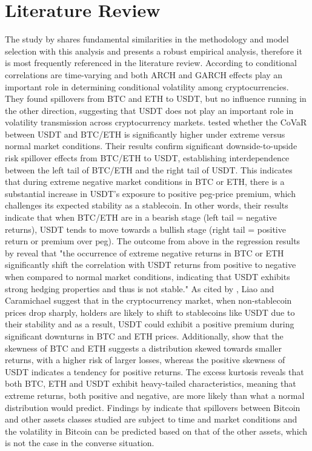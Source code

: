 \documentclass[12pt,a4paper,titlepage,oneside,english]{article}
\begin{document}

\section{Literature Review}

The study by \parencite{Chen03032026} shares fundamental similarities in the methodology and model selection with this analysis and presents a robust empirical analysis, therefore it is most frequently referenced in the literature review.
According to \parencite{jrfm14100493} conditional correlations are time-varying and both ARCH and GARCH effects play an important role in determining conditional volatility among cryptocurrencies. They found spillovers from BTC and ETH to USDT, but no influence running in the other direction, suggesting that USDT does not play an important role in volatility transmission across cryptocurrency markets.
\parencite{Chen03032026} tested whether the CoVaR between USDT and BTC/ETH is significantly higher under extreme versus normal market conditions. Their results confirm significant downside-to-upside risk spillover effects from BTC/ETH to USDT, establishing interdependence between the left tail of BTC/ETH and the right tail of USDT. This indicates that during extreme negative market conditions in BTC or ETH, there is a substantial increase in USDT’s exposure to positive peg-price premium, which challenges its expected stability as a stablecoin. In other words, their results indicate that when BTC/ETH are in a bearish stage (left tail = negative returns), USDT tends to move towards a bullish stage (right tail = positive return or premium over peg).
The outcome from above in the regression results by \parencite{Chen03032026} reveal that "the occurrence of extreme negative returns in BTC or ETH significantly shift the correlation with USDT returns from positive to negative when compared to normal market conditions, indicating that USDT exhibits strong hedging properties and thus is not stable."
As cited by \parencite{Chen03032026}, Liao and Caramichael \parencite{liao2022stablecoins} suggest that in the cryptocurrency market, when non-stablecoin prices drop sharply, holders are likely to shift to stablecoins like USDT due to their stability and as a result, USDT could exhibit a positive premium during significant downturns in BTC and ETH prices. 
Additionally, \parencite{Chen03032026} show that the  skewness of BTC and ETH suggests a distribution skewed towards smaller returns, with a higher risk of larger losses, whereas the positive skewness of USDT indicates a tendency for positive returns. The excess kurtosis reveals that both BTC, ETH and USDT exhibit heavy-tailed characteristics, meaning that extreme returns, both positive and negative, are more likely than what a normal distribution would predict. Findings by \parencite{Bouri26112018} indicate that spillovers between Bitcoin and other assets classes studied are subject to time and market conditions and the volatility in Bitcoin can be predicted based on that of the other assets, which is not the case in the converse situation.
\end{document}

